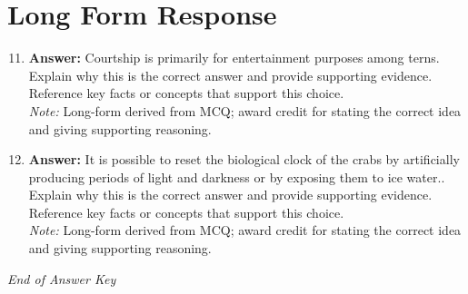 \documentclass[12pt]{article}
\begin{document}
\section*{Long Form Response}
\begin{enumerate}[label=\arabic*.]
\setcounter{enumi}{10}
\item \textbf{Answer:} Courtship is primarily for entertainment purposes among terns. Explain why this is the correct answer and provide supporting evidence. Reference key facts or concepts that support this choice.
\\ \textit{Note:} Long-form derived from MCQ; award credit for stating the correct idea and giving supporting reasoning.
\item \textbf{Answer:} It is possible to reset the biological clock of the crabs by artificially producing periods of light and darkness or by exposing them to ice water.. Explain why this is the correct answer and provide supporting evidence. Reference key facts or concepts that support this choice.
\\ \textit{Note:} Long-form derived from MCQ; award credit for stating the correct idea and giving supporting reasoning.
\end{enumerate}

\vfill
\noindent\textit{End of Answer Key}
\end{document}
